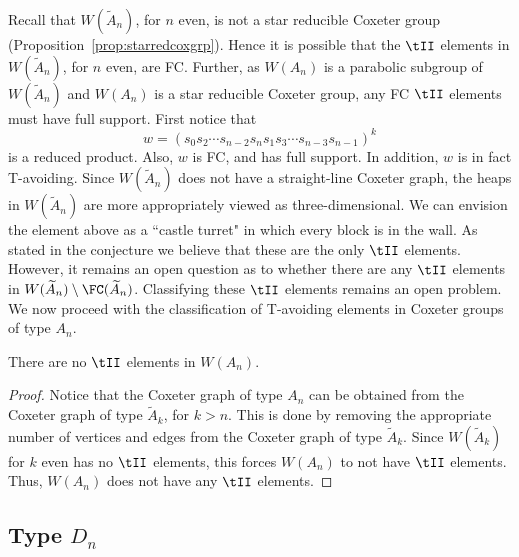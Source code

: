 Recall that $W(\widetilde{A}_n)$, for $n$ even, is not a star reducible Coxeter group (Proposition~\ref{prop:starredcoxgrp}). Hence it is possible that the $\tII$ elements in $W(\widetilde{A}_n)$, for $n$ even, are FC. Further, as $W(A_n)$ is a parabolic subgroup of $W(\widetilde{A}_n)$ and $W(A_n)$ is a star reducible Coxeter group, any FC $\tII$ elements must have full support. First notice that 
\[w=(s_0s_2 \cdots s_{n-2}s_ns_1s_3 \cdots s_{n-3}s_{n-1})^k\] 
is a reduced product. Also, $w$ is FC, and has full support. In addition, $w$ is in fact T-avoiding. Since $W(\widetilde{A}_n)$ does not have a straight-line Coxeter graph, the heaps in $W(\widetilde{A}_n)$ are more appropriately viewed as three-dimensional. We can envision the element above as a ``castle turret" in which every block is in the wall. As stated in the conjecture we believe that these are the only $\tII$ elements. However, it remains an open question as to whether there are any $\tII$ elements in $W(\widetilde{A}_n)\setminus \FC(\widetilde{A}_n)$. Classifying these $\tII$ elements remains an open problem. We now proceed with the classification of T-avoiding elements in Coxeter groups of type $A_n$. 

\begin{theorem}
There are no $\tII$ elements in $W(A_n)$. 
\begin{proof}
Notice that the Coxeter graph of type $A_n$ can be obtained from the Coxeter graph of type $\widetilde{A}_k$, for $k > n$. This is done by removing the appropriate number of vertices and edges from the Coxeter graph of type $\widetilde{A}_k$. Since $W(\widetilde{A}_k)$ for $k$ even has no $\tII$ elements, this forces $W(A_n)$ to not have $\tII$ elements. Thus, $W(A_n)$ does not have any $\tII$ elements.  
\end{proof}
\end{theorem}



\subsection{Type $D_n$}

